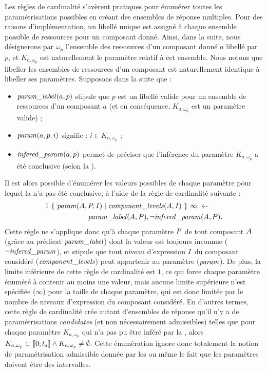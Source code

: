 Les règles de cardinalité s'avèrent pratiques pour énumérer toutes les paramétrisations
possibles en créant des ensembles de réponse multiples.
Pour des raisons d'implémentation, un libellé unique est assigné à chaque ensemble possible
de ressources pour un composant donné.
Ainsi, dans la suite, nous désignerons par $\omega_p$ l'ensemble des ressources
d'un composant donné $a$ libellé par $p$,
et $K_{a,\omega_p}$ est naturellement le paramètre relatif à cet ensemble.
Nous notons que libeller les ensembles de ressources d'un composant
est naturellement identique à libeller ses paramètres.
Supposons dans la suite que :
\begin{itemize}
  \item $\mathit{param\_label}(a, p)$ stipule que $p$ est un libellé valide pour un ensemble de ressources
    d'un composant $a$ (et en conséquence, $K_{a,\omega_p}$ est un paramètre valide) ;
  \item $\mathit{param}(a, p, i)$ signifie : $i \in K_{a, \omega_p}$ ;
  \item $\mathit{infered\_param}(a, p)$ permet de préciser que l'inférence du paramètre $K_{a, \omega_p}$
    a été conclusive (selon la ).
\end{itemize}
Il est alors possible d'énumérer les valeurs possibles de chaque paramètre pour lequel
la  n'a pas été conclusive, à l'aide de la règle de cardinalité
suivante :
\begin{align*}
  & 1\ \{\ \mathit{param}(A, P, I) \mid \mathit{component\_levels}(A,
  I)\ \}\ \infty\ \leftarrow \\
  & \qquad\qquad\qquad \mathit{param\_label}(A, P), \neg \mathit{infered\_param}(A, P).
\end{align*}
Cette règle ne s'applique donc qu'à chaque paramètre $P$ de tout composant $A$
(grâce au prédicat $\mathit{param\_label}$) dont la valeur est toujours inconnue ($\neg \mathit{infered\_param}$),
et stipule que tout niveau d'expression $I$ du composant considéré ($\mathit{component\_levels}$)
peut appartenir au paramètre ($\mathit{param}$).
De plus, la limite inférieure de cette règle de cardinalité est $1$, ce qui force chaque
paramètre énuméré à contenir au moins une valeur,
mais aucune limite supérieure n'est spécifiée ($\infty$) pour la taille de chaque paramètre,
qui est donc limitée par le nombre de niveaux d'expression du composant considéré.
En d'autres termes, cette règle de cardinalité crée autant d'ensembles de réponse qu'il n'y
a de paramétrisations \emph{candidates} (et non nécessairement admissibles)
telles que pour chaque paramètre $K_{a, \omega_p}$ qui n'a pas pu être inféré par
la ,
alors $K_{a, \omega_p} \subset \mathopen{\llbracket}0\mathclose{};l_a\mathclose{\rrbracket} \wedge K_{a, \omega_p} \neq \emptyset$.
Cette énumération ignore donc totalement la notion de paramétrisation admissible
donnée par les \enumparamcr{}
ou même le fait que les paramètres doivent être des intervalles.



